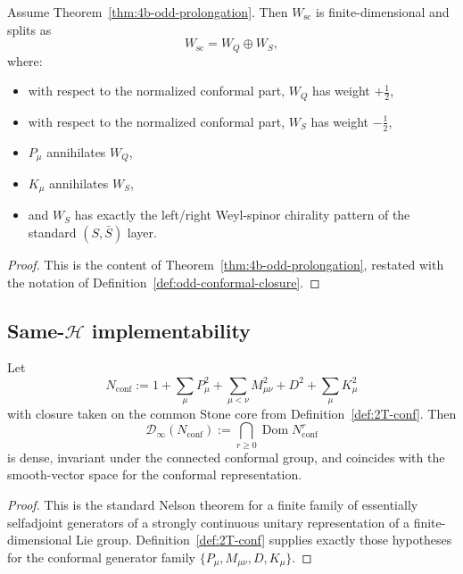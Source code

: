 \begin{theorem}
\label{thm:odd-conformal-closure-finite}
Assume Theorem~\ref{thm:4b-odd-prolongation}. Then \(W_{\mathrm{sc}}\) is
finite-dimensional and splits as
\[
W_{\mathrm{sc}} = W_Q \oplus W_S,
\]
where:
\begin{itemize}
  \item with respect to the normalized conformal part, \(W_Q\) has weight
        \(+\tfrac12\),
  \item with respect to the normalized conformal part, \(W_S\) has weight
        \(-\tfrac12\),
  \item \(P_\mu\) annihilates \(W_Q\),
  \item \(K_\mu\) annihilates \(W_S\),
  \item and \(W_S\) has exactly the left/right Weyl-spinor chirality pattern of
        the standard \((S,\bar S)\) layer.
\end{itemize}
\end{theorem}

\begin{proof}
This is the content of Theorem~\ref{thm:4b-odd-prolongation}, restated with the
notation of Definition~\ref{def:odd-conformal-closure}.
\end{proof}

\subsection{Same-\texorpdfstring{$\mathcal H$}{H} implementability}
\label{subsec:4b-sameH}

\begin{lemma}
\label{lem:4b-conformal-nelson-domain}
Let
\[
N_{\mathrm{conf}}
:=
1+\sum_\mu P_\mu^2+\sum_{\mu<\nu}M_{\mu\nu}^2+D^2+\sum_\mu K_\mu^2
\]
with closure taken on the common Stone core from
Definition~\ref{def:2T-conf}. Then
\[
\mathcal D_\infty(N_{\mathrm{conf}})
:=
\bigcap_{r\geq 0}\operatorname{Dom}N_{\mathrm{conf}}^r
\]
is dense, invariant under the connected conformal group, and coincides with the
smooth-vector space for the conformal representation.
\end{lemma}

\begin{proof}
This is the standard Nelson theorem for a finite family of essentially
selfadjoint generators of a strongly continuous unitary representation of a
finite-dimensional Lie group. Definition~\ref{def:2T-conf} supplies exactly those
hypotheses for the conformal generator family
\(\{P_\mu,M_{\mu\nu},D,K_\mu\}\).
\end{proof}

